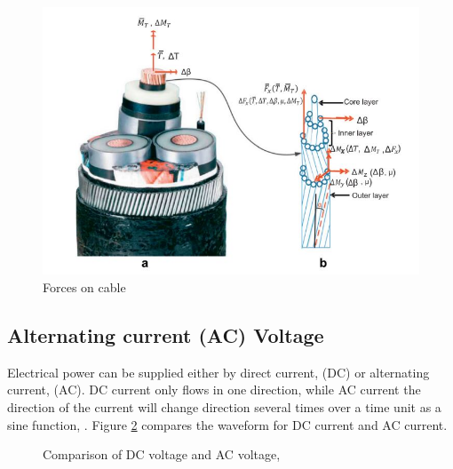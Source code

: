 \begin{figure}[h!]
\centering
\includegraphics[scale=0.7]{figures/cable}
\caption[$\; \:$Forces on cable]{Forces on cable  \cite{Nasution2013} }
 \label{fig:cable}
\end{figure}

\subsection{Alternating current (AC) Voltage}
Electrical power can be supplied either by direct current, (DC) or alternating current, (AC). DC current only flows in one direction, while AC current the direction of the current will change direction several times over a time unit as a sine function, \cite{Dale2000}. Figure \ref{fig:acdc} compares the waveform for DC current and AC current.


\begin{figure}[H]
\hfill
{}\hfill
\caption[$\; \:$Comparison of DC voltage and AC voltage]{Comparison of DC voltage and AC voltage, \cite{Dale2000}}
\label{fig:acdc}
\end{figure}

